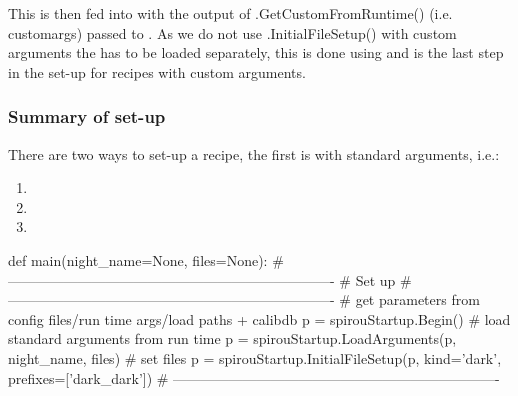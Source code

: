 This is then fed into \spirouStartup{} with the output of \spirouStartup.GetCustomFromRuntime() (i.e. customargs) passed to \spirouStartup{}. As we do not use \spirouStartup.InitialFileSetup() with custom arguments the \calibdb has to be loaded separately, this is done using \spirouStartup{} and is the last step in the set-up for recipes with custom arguments.


\subsubsection{Summary of set-up}
\label{ch:the_recipes:gen_layout:summary}

There are two ways to set-up a recipe, the first is with standard arguments, i.e.:
\begin{enumerate}
	\item \spirouStartup{}
	\item \spirouStartup{}
	\item \spirouStartup{}
\end{enumerate}
\begin{pythonbox}
def main(night_name=None, files=None):
    # ----------------------------------------------------------------------
    # Set up
    # ----------------------------------------------------------------------
    # get parameters from config files/run time args/load paths + calibdb
    p = spirouStartup.Begin()
    # load standard arguments from run time
    p = spirouStartup.LoadArguments(p, night_name, files)
    # set files 
    p = spirouStartup.InitialFileSetup(p, kind='dark', prefixes=['dark_dark'])
    # ----------------------------------------------------------------------
\end{pythonbox}

